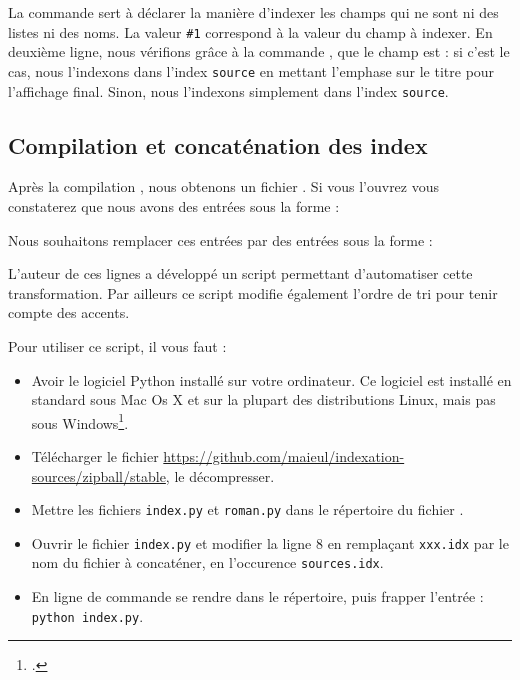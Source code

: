 La commande  sert à déclarer la manière d'indexer les champs qui ne sont ni des listes ni des noms. La valeur \verb|#1| correspond à la valeur du champ à indexer. En deuxième ligne, nous vérifions grâce à la commande , que le champ    est  : si c'est le cas, nous l'indexons dans l'index \verb|source| en mettant l'emphase sur le titre pour l'affichage final. Sinon, nous l'indexons simplement dans l'index \verb|source|.

\subsection{Compilation et concaténation des index}\label{scriptpython}


Après la  compilation \XeLaTeX, nous obtenons un fichier . Si vous l'ouvrez vous constaterez que nous avons des entrées sous la forme : 

\begin{latexcode}
\end{latexcode}

Nous souhaitons remplacer ces entrées par des entrées sous la forme :

\begin{latexcode}
\end{latexcode}

L'auteur de ces lignes a développé un script permettant d'automatiser cette transformation. Par ailleurs ce script modifie également l'ordre de tri pour tenir compte des accents.

Pour utiliser ce script, il vous faut :\label{python}
\begin{itemize}
\item Avoir le logiciel Python installé sur votre ordinateur. Ce logiciel est installé en standard sous Mac Os X et sur la plupart des distributions Linux, mais pas sous Windows\footcite{python_windows}.
\item Télécharger le fichier \url{https://github.com/maieul/indexation-sources/zipball/stable}, le décompresser.
\item Mettre les fichiers \verb|index.py| et \verb|roman.py| dans le répertoire du fichier . 
\item Ouvrir le fichier \verb|index.py| et modifier la ligne 8 en remplaçant \verb|xxx.idx| par le nom du fichier à concaténer, en l'occurence \verb|sources.idx|.
\item En ligne de commande se rendre dans le  répertoire, puis frapper l'entrée : \verb|python index.py|.
\end{itemize}


